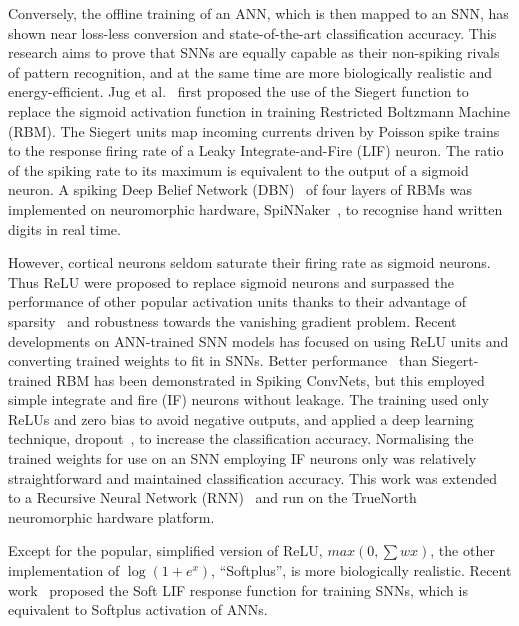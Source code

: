 \documentclass[runningheads,a4paper]{llncs}
\begin{document}

Conversely, the offline training of an ANN, which is then mapped to an SNN, has shown near loss-less conversion and state-of-the-art classification accuracy.
This research aims to prove that SNNs are equally capable as their non-spiking rivals of pattern recognition, and at the same time are more biologically realistic and energy-efficient.
Jug et al.~\cite{Jug_etal_2012} first proposed the use of the Siegert function to replace the sigmoid activation function in training Restricted Boltzmann Machine (RBM).
The Siegert units map incoming currents driven by Poisson spike trains to the response firing rate of a Leaky Integrate-and-Fire (LIF) neuron.
The ratio of the spiking rate to its maximum is equivalent to the output of a sigmoid neuron.
A spiking Deep Belief Network (DBN)~\cite{Stromatias2015scalable} of four layers of RBMs was implemented on neuromorphic hardware, SpiNNaker~\cite{furber2014spinnaker}, to recognise hand written digits in real time.

However, cortical neurons seldom saturate their firing rate as sigmoid neurons.
Thus ReLU were proposed to replace sigmoid neurons and surpassed the performance of other popular activation units thanks to their advantage of sparsity~\cite{glorot2011deep} and robustness towards the vanishing gradient problem. %
Recent developments on ANN-trained SNN models has focused on using ReLU units and converting trained weights to fit in SNNs.
Better performance~\cite{cao2015spiking,diehl2015fast} than Siegert-trained RBM has been demonstrated in Spiking ConvNets, but this employed simple integrate and fire (IF) neurons without leakage.
The training used only ReLUs and zero bias to avoid negative outputs, and applied a deep learning technique, dropout~\cite{srivastava2014dropout}, to increase the classification accuracy.
Normalising the trained weights for use on an SNN employing IF neurons only was relatively straightforward and maintained classification accuracy.
This work was extended to a Recursive Neural Network (RNN)~\cite{diehl2016conversion} and run on the TrueNorth~\cite{merolla2014million} neuromorphic hardware platform.

Except for the popular, simplified version of ReLU, $max(0,\sum w x)$, the other implementation of $\log(1+e^x)$, ``Softplus'', is more biologically realistic.
Recent work~\cite{hunsberger2015spiking} proposed the Soft LIF response function for training SNNs, which is equivalent to Softplus activation of ANNs.
\end{document}
